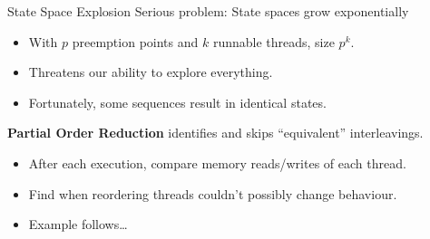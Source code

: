 \documentclass[xcolor=dvipsnames]{beamer}
\begin{document}
\begin{frame}{State Space Explosion}
	Serious problem: State spaces grow exponentially
	\begin{itemize}
		\item With $p$ preemption points and $k$ runnable threads, size $p^k$.
		\item Threatens our ability to explore everything.
		\item Fortunately, some sequences result in identical states.
	\end{itemize}
	\linegap

	{\bf Partial Order Reduction} identifies and skips ``equivalent'' interleavings.
	\begin{itemize}
		\item After each execution, compare memory reads/writes of each thread.
		\item Find when reordering threads couldn't possibly change behaviour.
		\item Example follows\dots
	\end{itemize}
\end{frame}
\end{document}
